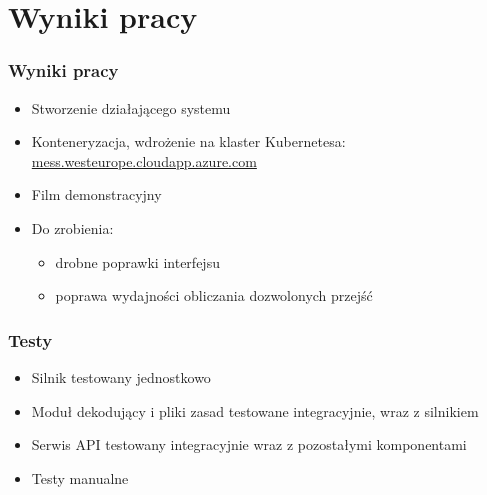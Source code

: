 \documentclass{beamer}
\begin{document}
\section{Wyniki pracy}

\begin{frame}
	\frametitle{Wyniki pracy}
	\begin{itemize}
		\item Stworzenie działającego systemu
		\item Konteneryzacja, wdrożenie na klaster Kubernetesa: \url{mess.westeurope.cloudapp.azure.com}
		\item Film demonstracyjny
		\item Do zrobienia:
		\begin{itemize}
			\item drobne poprawki interfejsu
			\item poprawa wydajności obliczania dozwolonych przejść
		\end{itemize}
	\end{itemize}
\end{frame}

\begin{frame}
	\frametitle{Testy}
	\begin{itemize}
		\item Silnik testowany jednostkowo
		\item Moduł dekodujący i pliki zasad testowane integracyjnie, wraz z silnikiem
		\item Serwis API testowany integracyjnie wraz z pozostałymi komponentami
		\item Testy manualne
	\end{itemize}
\end{frame}




\end{document}
